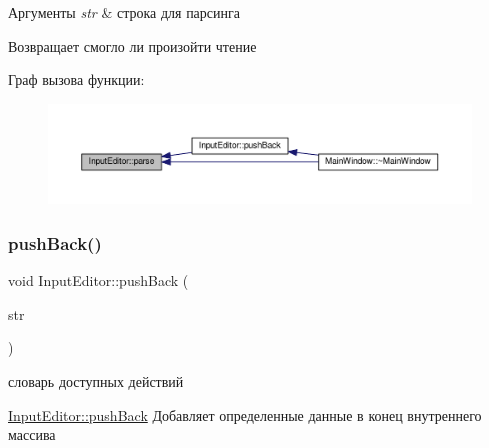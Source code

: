 \begin{DoxyParams}{Аргументы}
{\em str} & строка для парсинга \\
\hline
\end{DoxyParams}
\begin{DoxyReturn}{Возвращает}
смогло ли произойти чтение 
\end{DoxyReturn}
Граф вызова функции\+:\nopagebreak
\begin{figure}[H]
\begin{center}
\leavevmode
\includegraphics[width=350pt]{class_input_editor_ad9a9e03d439e909c6d72775ef78d9814_icgraph}
\end{center}
\end{figure}
\mbox{\label{class_input_editor_a4b357e281c2d9cf669ed4a03c8de5190}} 
\subsubsection{\texorpdfstring{push\+Back()}{pushBack()}}
{\footnotesize\ttfamily void Input\+Editor\+::push\+Back (\begin{DoxyParamCaption}\item[{const Q\+String \&}]{str }\end{DoxyParamCaption})}



словарь доступных действий 

\hyperlink{class_input_editor_a4b357e281c2d9cf669ed4a03c8de5190}{Input\+Editor\+::push\+Back} Добавляет определенные данные в конец внутреннего массива


